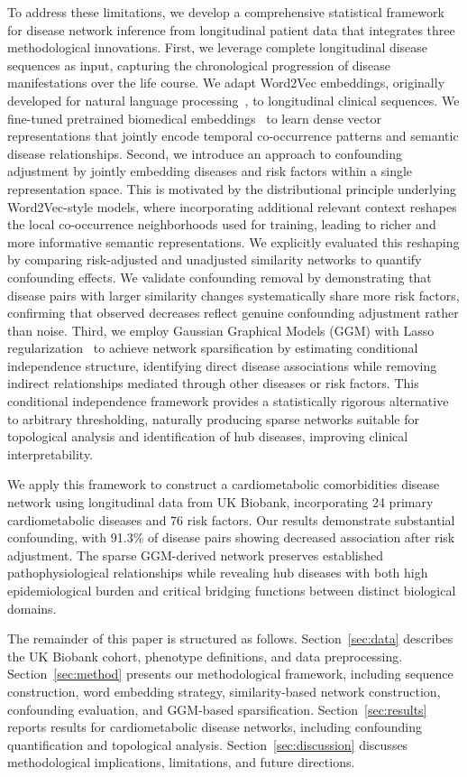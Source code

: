 To address these limitations, we develop a comprehensive statistical framework for disease network inference from longitudinal patient data that integrates three methodological innovations. First, we leverage complete longitudinal disease sequences as input, capturing the chronological progression of disease manifestations over the life course. We adapt Word2Vec embeddings, originally developed for natural language processing~\citet{mikolov2013efficient}, to longitudinal clinical sequences. We fine-tuned pretrained biomedical embeddings~\citet{zhang2019biowordvec} to learn dense vector representations that jointly encode temporal co-occurrence patterns and semantic disease relationships. Second, we introduce an approach to confounding adjustment by jointly embedding diseases and risk factors within a single representation space. This is motivated by the distributional principle underlying Word2Vec-style models, where incorporating additional relevant context reshapes the local co-occurrence neighborhoods used for training, leading to richer and more informative semantic representations. We explicitly evaluated this reshaping by comparing risk-adjusted and unadjusted similarity networks to quantify confounding effects. We validate confounding removal by demonstrating that disease pairs with larger similarity changes systematically share more risk factors, confirming that observed decreases reflect genuine confounding adjustment rather than noise. Third, we employ Gaussian Graphical Models (GGM) with Lasso regularization~\citet{meinshausen2006high} to achieve network sparsification by estimating conditional independence structure, identifying direct disease associations while removing indirect relationships mediated through other diseases or risk factors. This conditional independence framework provides a statistically rigorous alternative to arbitrary thresholding, naturally producing sparse networks suitable for topological analysis and identification of hub diseases, improving clinical interpretability.

We apply this framework to construct a cardiometabolic comorbidities disease network using longitudinal data from UK Biobank, incorporating 24 primary cardiometabolic diseases and 76 risk factors. Our results demonstrate substantial confounding, with 91.3\% of disease pairs showing decreased association after risk adjustment. The sparse GGM-derived network preserves established pathophysiological relationships while revealing hub diseases with both high epidemiological burden and critical bridging functions between distinct biological domains. 

The remainder of this paper is structured as follows. Section~\ref{sec:data} describes the UK Biobank cohort, phenotype definitions, and data preprocessing. Section~\ref{sec:method} presents our methodological framework, including sequence construction, word embedding strategy, similarity-based network construction, confounding evaluation, and GGM-based sparsification. Section~\ref{sec:results} reports results for cardiometabolic disease networks, including confounding quantification and topological analysis. Section~\ref{sec:discussion} discusses methodological implications, limitations, and future directions.